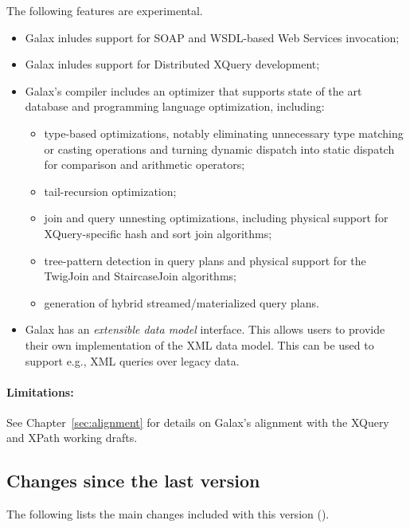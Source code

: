The following features are experimental.

\begin{itemize}
\item Galax inludes support for SOAP and WSDL-based Web Services
  invocation;
\item Galax inludes support for Distributed XQuery development;
\item Galax's compiler includes an optimizer that supports state of
  the art database and programming language optimization, including:
  \begin{itemize}
  \item type-based optimizations, notably eliminating unnecessary type
    matching or casting operations and turning dynamic dispatch into
    static dispatch for comparison and arithmetic operators;
  \item tail-recursion optimization;
  \item join and query unnesting optimizations, including physical
    support for XQuery-specific hash and sort join algorithms;
  \item tree-pattern detection in query plans and physical support for
    the TwigJoin and StaircaseJoin algorithms;
  \item generation of hybrid streamed/materialized query plans.
  \end{itemize}
\item Galax has an \emph{extensible data model} interface. This allows
  users to provide their own implementation of the XML data
  model. This can be used to support e.g., XML queries over legacy
  data.
\end{itemize}

\paragraph{Limitations:} See Chapter~\ref{sec:alignment} for details
  on Galax's alignment with the XQuery and XPath working drafts.

\subsection{Changes since the last version}

The following lists the main changes included with this version
(\version).

